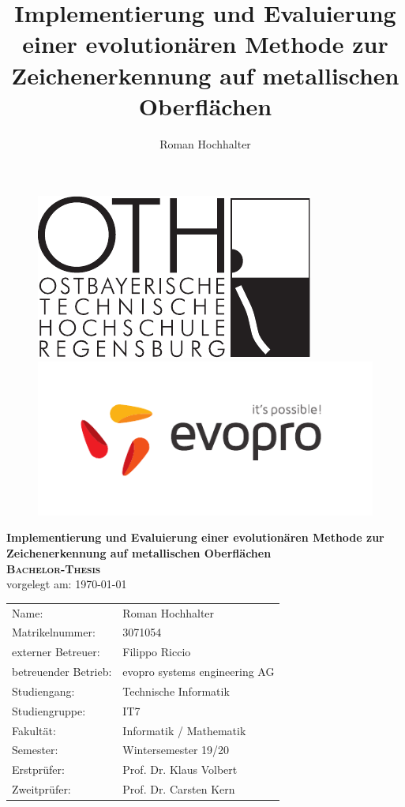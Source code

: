 \documentclass[10pt,a4paper,abstraction]{scrreprt}
\author{Roman Hochhalter}
\title{Implementierung und Evaluierung einer evolutionären Methode zur Zeichenerkennung auf metallischen Oberflächen}
\begin{document}
	\begin{titlepage}
		\begin{figure}[!htb]
			\begin{minipage}{0.48\textwidth}
				\includegraphics[width=0.3\linewidth]{Logo_OTH_Regensburg}
			\end{minipage}
			\hfill
			\begin{minipage}{0.48\textwidth}
				\flushright
				\includegraphics[width=0.5\linewidth]{evopro_logo_cmyk}
			\end{minipage}
		\end{figure}
		
		\vspace*{0.5cm}
		
		\begin{center}
			\huge \textbf{\textsf{Implementierung und Evaluierung einer evolutionären Methode zur Zeichenerkennung auf metallischen Oberflächen}} \\
			\vspace{5cm}
			\huge\textbf{\textsc{Bachelor-Thesis}} \\
			\vspace{1cm}
			\normalsize{vorgelegt am: \today} \\
			\vspace{2.5cm}
			\vspace{3cm}
			\normalsize{
				\begin{tabular}{ll}
					Name: & {Roman Hochhalter} \\
					Matrikelnummer: & {3071054} \\
					externer Betreuer: & Filippo Riccio \\
					betreuender Betrieb: & evopro systems engineering AG \\
					Studiengang: & Technische Informatik \\
					Studiengruppe: & IT7 \\
					Fakultät: & Informatik / Mathematik \\
					Semester: & Wintersemester 19/20 \\
					Erstprüfer: & {Prof. Dr. Klaus Volbert} \\
					Zweitprüfer: & {Prof. Dr. Carsten Kern} \\
				\end{tabular}
			}
		\end{center}
	\end{titlepage}
\end{document}
